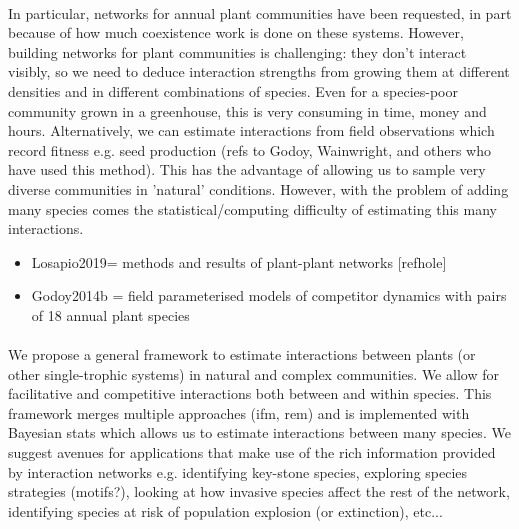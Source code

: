 \documentclass[a4,12pt]{article}
\begin{document}
    \paragraph{}
    In particular, networks for annual plant communities have been requested, in part because of how much coexistence work is done on these systems. However, building networks for plant communities is challenging: they don't interact visibly, so we need to deduce interaction strengths from growing them at different densities and in different combinations of species. Even for a species-poor community grown in a greenhouse, this is very consuming in time, money and hours. Alternatively, we can estimate interactions from field observations which record fitness e.g. seed production (refs to Godoy, Wainwright, and others who have used this method). This has the advantage of allowing us to sample very diverse communities in 'natural' conditions. However, with the problem of adding many species comes the statistical/computing difficulty of estimating this many interactions.
    \begin{itemize}
        \item Losapio2019= methods and results of plant-plant networks [refhole]
        \item Godoy2014b = field parameterised models of competitor dynamics with pairs of 18 annual plant species
    \end{itemize}


    
    \paragraph{}
    We propose a general framework to estimate interactions between plants (or other single-trophic systems) in natural and complex communities. We allow for facilitative and competitive interactions both between and within species. 
    This framework merges multiple approaches (ifm, rem) and is implemented with Bayesian stats which allows us to estimate interactions between many species. 
    We suggest avenues for applications that make use of the rich information provided by interaction networks e.g. identifying key-stone species, exploring species strategies (motifs?), looking at how invasive species affect the rest of the network, identifying species at risk of population explosion (or extinction), etc...

\end{document}
